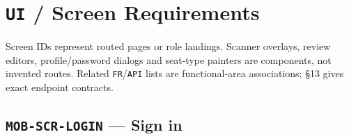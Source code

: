 \clearpage
\section{\texttt{UI} /\allowbreak{} Screen Requirements}\label{sec:srs-12}
Screen IDs represent routed pages or role landings. Scanner overlays, review editors, profile/\allowbreak{}password dialogs and seat-type painters are components, not invented routes. Related \texttt{FR}/\allowbreak{}\texttt{API} lists are functional-area associations; §13 gives exact endpoint contracts.

\subsection{\texttt{MOB-\allowbreak{}SCR-\allowbreak{}LOGIN} — Sign in}
\begingroup
\fontsize{9.5}{12}\selectfont
\setlength{\SRSWidth}{\dimexpr\linewidth-2\tabcolsep\relax}
